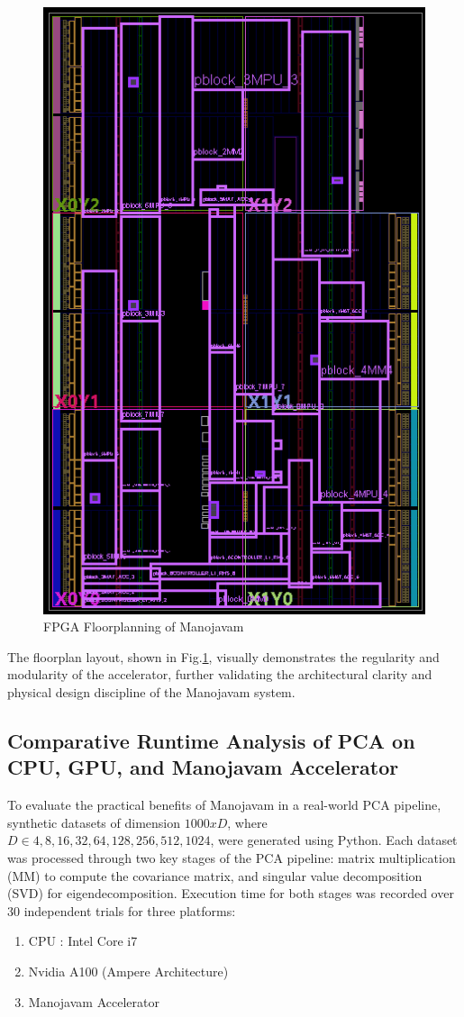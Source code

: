 \begin{figure}[H]
	\centerline{\includegraphics[scale = 1]{Figures/fpga_floorplaned.png}}
	\caption{FPGA Floorplanning of Manojavam}
	\label{fig:FPGA Floorplanning of Manojavam}
\end{figure}

The floorplan layout, shown in Fig.\ref{fig:FPGA Floorplanning of Manojavam}, visually demonstrates the regularity and modularity of the accelerator, further validating the architectural clarity and physical design discipline of the Manojavam system.

\subsection{Comparative Runtime Analysis of PCA on CPU, GPU, and Manojavam Accelerator}
To evaluate the practical benefits of Manojavam in a real-world PCA pipeline, synthetic datasets of dimension $1000xD$, where $D \in {4, 8, 16, 32, 64, 128, 256, 512, 1024}$, were generated using Python. Each dataset was processed through two key stages of the PCA pipeline: matrix multiplication (MM) to compute the covariance matrix, and singular value decomposition (SVD) for eigendecomposition. Execution time for both stages was recorded over 30 independent trials for three platforms:
\begin{enumerate}
	\item CPU : Intel Core i7\cite{chap5-1}
	\item Nvidia A100 (Ampere Architecture)\cite{chap5-2}
	\item Manojavam Accelerator
\end{enumerate}

